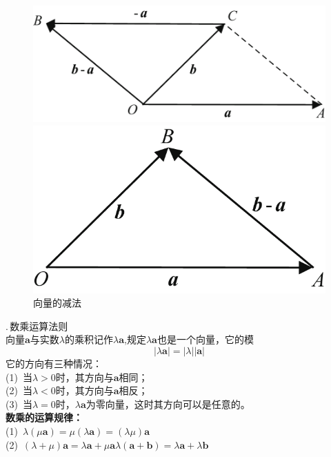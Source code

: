 \begin{figure}[h]
	\begin{minipage}{0.5\linewidth}
		\centering
		\includegraphics[width = 0.81\linewidth]{pic/C-5/vecdel}
	\end{minipage}
	\begin{minipage}{0.5\linewidth}
		\centering
		\includegraphics[width = 0.57\linewidth]{pic/C-5/vecdel2}
	\end{minipage}
	\caption{向量的减法}
	\label{向量的减法}
\end{figure}

.$\,$数乘运算法则\\

\vspace*{-1em} \vspace*{-1em}
向量$\boldsymbol{a}$与实数$\lambda$的乘积记作$\lambda\boldsymbol{a}$,规定$\lambda\boldsymbol{a}$也是一个向量，它的模
\begin{equation}
	|\lambda\boldsymbol{a}|=|\lambda||\boldsymbol{a}|
\end{equation}
它的方向有三种情况：\\
(1)$\,$ 当$\lambda>0$时，其方向与$\boldsymbol{a}$相同；\\
(2)$\,$ 当$\lambda<0$时，其方向与$\boldsymbol{a}$相反；\\
(3)$\,$ 当$\lambda=0$时，$\lambda\boldsymbol{a}$为零向量，这时其方向可以是任意的。\\
\textbf{数乘的运算规律：}\\
(1)$\,$  \qquad
$\lambda(\mu\boldsymbol{a})=\mu(\lambda\boldsymbol{a})=(\lambda\mu)\boldsymbol{a}$\\
(2)$\,$  \qquad
$(\lambda+\mu)\boldsymbol{a}=\lambda\boldsymbol{a}+\mu \boldsymbol{a}$\qquad $\lambda(\boldsymbol{a}+\boldsymbol{b})=\lambda\boldsymbol{a}+\lambda\boldsymbol{b}$
